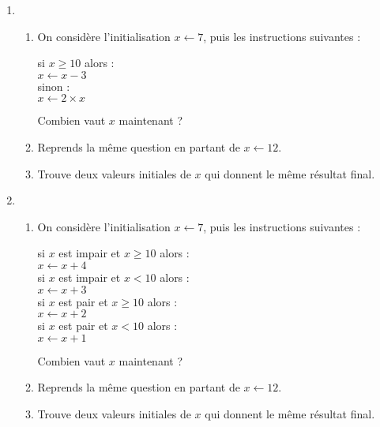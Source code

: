 \documentclass[class=report,crop=false, 12pt]{standalone}
\begin{document}
\begin{activite}
\sauteligne
\begin{enumerate}
  \item  
  \begin{enumerate}
    \item On considère l'initialisation $x \leftarrow 7$, puis les instructions suivantes :

 
\indentation si $x \ge 10$ alors : \\ 
\indentation\indentation $x \leftarrow x - 3$ \\
\indentation sinon : \\
\indentation\indentation $x \leftarrow 2 \times x$
 
Combien vaut $x$ maintenant ?
  
    \item Reprends la même question en partant de $x \leftarrow 12$.
  
    \item Trouve deux valeurs initiales de $x$ qui donnent le même résultat final.
  
  \end{enumerate}  
  \item
  \begin{enumerate}

    \item On considère l'initialisation $x \leftarrow 7$, puis les instructions suivantes :
    
\indentation si $x$ est impair et $x \ge 10$ alors : \\ 
\indentation\indentation $x \leftarrow x + 4$ \\
\indentation si $x$ est impair et $x < 10$ alors : \\ 
\indentation\indentation $x \leftarrow x + 3$ \\
\indentation si $x$ est pair et $x \ge 10$ alors : \\ 
\indentation\indentation $x \leftarrow x + 2$ \\
\indentation si $x$ est pair et $x < 10$ alors : \\ 
\indentation\indentation $x \leftarrow x + 1$ 
 
Combien vaut $x$ maintenant ?

    \item Reprends la même question en partant de $x \leftarrow 12$.
  
    \item Trouve deux valeurs initiales de $x$ qui donnent le même résultat final.  
  
  \end{enumerate}   
\end{enumerate}
\end{activite}
\end{document}
